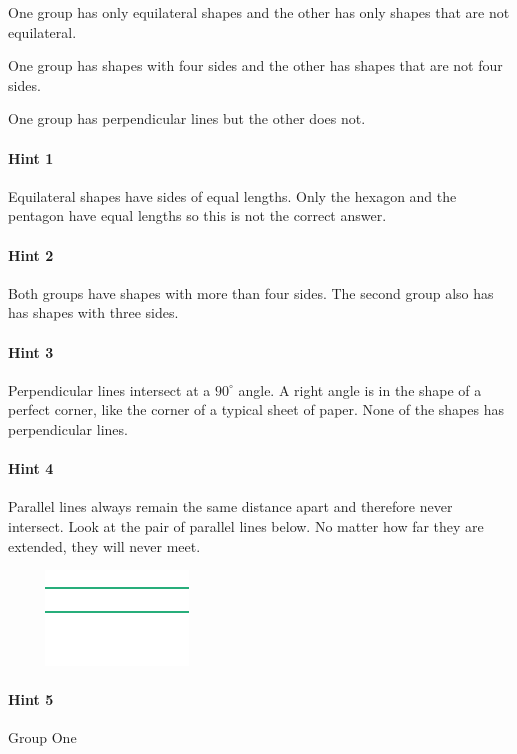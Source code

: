 \documentclass[twocolumn,10pt]{article}
\def\shrinkfactor{0.55}
\begin{document}

 One group has only equilateral shapes and the other has only shapes that are not equilateral.

One group has shapes with four sides and the other has shapes that are not four sides.

One group has perpendicular lines but the other does not.



\paragraph{Hint 1}Equilateral shapes have sides of equal lengths.  Only the hexagon and the pentagon have equal lengths so this is not the correct answer.

\paragraph{Hint 2}Both groups have shapes with more than four sides.  The second group also has has shapes with three sides.

\paragraph{Hint 3}Perpendicular lines intersect at a $90 ^\circ$ angle.
A right angle is in the shape of a perfect corner, like the corner of a typical sheet of paper.  None of the shapes has perpendicular lines.

\paragraph{Hint 4}Parallel lines always remain the same distance apart and therefore never intersect.  Look at the pair of parallel lines below.  No matter how far they are extended, they will never meet.

$\phantom{xxxx}$
\includegraphics[scale=\shrinkfactor]{figures/7cf1fbfb7516a57d37ad80007a3886c81c33f393.png}  


\paragraph{Hint 5}Group One 
\end{document}
